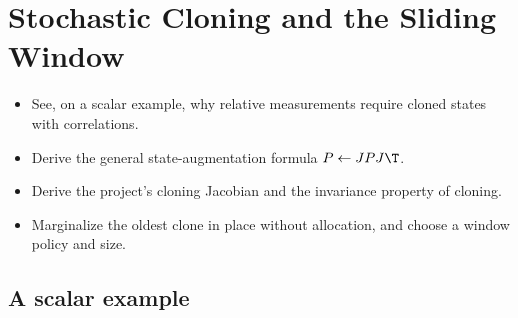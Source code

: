 \chapter{Stochastic Cloning and the Sliding Window}
\label{ch:cloning}

\begin{objectives}
\begin{itemize}
  \item See, on a scalar example, why relative measurements require cloned states with correlations.
  \item Derive the general state-augmentation formula $P \gets JPJ\T$.
  \item Derive the project's cloning Jacobian and the invariance property of cloning.
  \item Marginalize the oldest clone in place without allocation, and choose a window policy and size.
\end{itemize}
\end{objectives}

\section{A scalar example}

